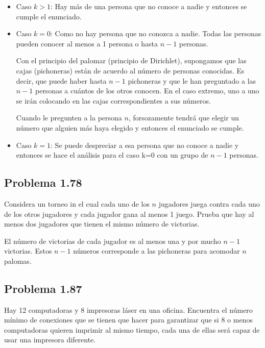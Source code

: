 \begin{itemize}
\item Caso $k>1$: Hay m\'as de una persona que no conoce a nadie y entonces se
cumple el enunciado.
	
\item Caso $k=0$: Como no hay persona que no conozca a nadie. Todas las personas
pueden conocer al menos a 1 persona o hasta $n-1$ personas. 
	
Con el principio del palomar (principio de Dirichlet), supongamos que las cajas
(pichoneras) están de acuerdo al n\'umero de personas conocidas. Es decir, que
puede haber hasta $n-1$ pichoneras y que le han preguntado a las $n-1$ personas
a cuántos de los otros conocen. En el caso extremo, uno a uno se ir\'an
colocando en las cajas correspondientes a sus n\'umeros.
	
Cuando le pregunten a la persona $n$, forsozamente tendr\'a que elegir un
n\'umero que alguien m\'as haya elegido y entonces el enunciado se cumple. 
	
\item Caso $k=1$: Se puede despreciar a esa persona que no conoce a nadie y
entonces se hace el an\'alisis para el caso k=0 con un grupo de $n-1$ personas.

\end{itemize}

\subsection*{Problema 1.78}

Considera un torneo in el cual cada uno de los $n$ jugadores juega contra cada
uno de los otros jugadores y cada jugador gana al menos 1 juego. Prueba que hay
al menos dos jugadores que tienen el mismo n\'umero de victorias.

El n\'umero de victorias de cada jugador es al menos una y por mucho $n-1$
victorias. Estos $n-1$ n\'umeros corresponde a las pichoneras para acomodar $n$
palomas.

\subsection*{Problema 1.87}
Hay 12 computadoras y 8 impresoras l\'aser en una oficina. Encuentra el n\'umero
m\'inimo de conexiones que se tienen que hacer para garantizar que si 8 o menos
computadoras quieren imprimir al mismo tiempo, cada una de ellas ser\'a capaz de
usar una impresora diferente.\\


